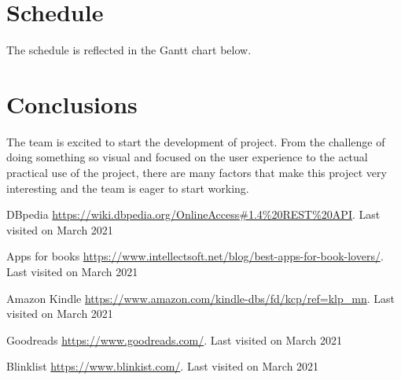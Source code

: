 \documentclass[twocolumn,twoside,11pt,a4paper]{article}
\begin{document}

\section{Schedule}\label{sec:schedule}

The schedule is reflected in the Gantt chart below.





\section{Conclusions}\label{sec:conclusions}

The team is excited to start the development of project. From the challenge of doing something so visual and focused on the user experience to the actual practical use of the project, there are many factors that make this project very interesting and the team is eager to start working.


\begin{thebibliography}{9}
DBpedia 
\url{https://wiki.dbpedia.org/OnlineAccess#1.4\%20REST\%20API}. 
Last visited on March 2021


Apps for books
\url{https://www.intellectsoft.net/blog/best-apps-for-book-lovers/}. 
Last visited on March 2021


Amazon Kindle
\url{https://www.amazon.com/kindle-dbs/fd/kcp/ref=klp_mn}. 
Last visited on March 2021


Goodreads 
\url{https://www.goodreads.com/}. 
Last visited on March 2021


Blinklist
\url{https://www.blinkist.com/}. 
Last visited on March 2021

\end{thebibliography}

\renewcommand{\bibname}{Referências}
%
%

%


\end{document}

